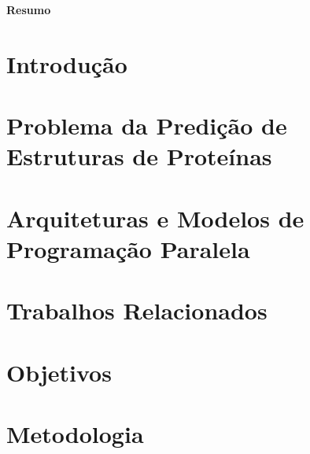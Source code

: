\documentclass[12pt,a4paper]{article}
\begin{document}
\pagestyle{empty}
\begin{center}
    {\bf \Large Resumo}
\end{center}



\noindent{}
\newpage
\pagestyle{empty}
\tableofcontents
\newpage
\setcounter{page}{1}
\pagestyle{plain}

\section{Introdução}
\label{section:introducao}


\section{Problema da Predição de Estruturas de Proteínas}
\label{section:problemapsp}


\section{Arquiteturas e Modelos de Programação Paralela}
\label{section:hpc}


\section{Trabalhos Relacionados}
\label{section:trabrelacionados}


\section{Objetivos}
\label{section:objetivos}


\section{Metodologia}
\label{section:metodologia}



\newpage



\end{document}
